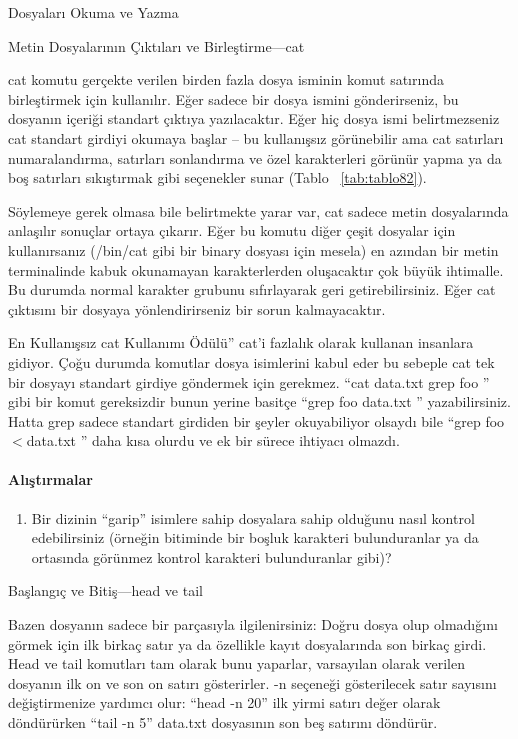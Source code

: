 \begin{section}{Dosyaları Okuma ve Yazma}
\begin{subsection}{Metin Dosyalarının Çıktıları ve Birleştirme—cat}

cat komutu gerçekte verilen birden fazla dosya isminin komut satırında birleştirmek için kullanılır. Eğer sadece bir dosya ismini gönderirseniz, bu dosyanın içeriği standart çıktıya yazılacaktır. Eğer hiç dosya ismi belirtmezseniz cat standart girdiyi okumaya başlar – bu kullanışsız görünebilir ama cat satırları numaralandırma, satırları sonlandırma ve özel karakterleri görünür yapma ya da boş satırları sıkıştırmak gibi seçenekler sunar (Tablo ~\ref{tab:tablo82}).

Söylemeye gerek olmasa bile belirtmekte yarar var, cat sadece metin dosyalarında anlaşılır sonuçlar ortaya çıkarır. Eğer bu komutu diğer çeşit dosyalar için kullanırsanız (/bin/cat gibi bir binary dosyası için mesela) en azından bir metin terminalinde kabuk okunamayan karakterlerden oluşacaktır çok büyük ihtimalle. Bu durumda normal karakter grubunu sıfırlayarak geri getirebilirsiniz. Eğer cat çıktısını bir dosyaya yönlendirirseniz bir sorun kalmayacaktır.

En Kullanışsız cat Kullanımı Ödülü” cat'i fazlalık olarak kullanan insanlara gidiyor. Çoğu durumda komutlar dosya isimlerini kabul eder bu sebeple cat tek bir dosyayı standart girdiye göndermek için gerekmez. “cat data.txt \textbar grep foo ” gibi bir komut gereksizdir bunun yerine basitçe “grep foo data.txt ” yazabilirsiniz. Hatta grep sadece standart girdiden bir şeyler okuyabiliyor olsaydı bile “grep foo $<$data.txt ” daha kısa olurdu ve ek bir sürece ihtiyacı olmazdı.

\paragraph{{\Huge{\PencilLeftDown}}Alıştırmalar}{
\begin{enumerate}
 \item Bir dizinin “garip” isimlere sahip dosyalara sahip olduğunu nasıl kontrol edebilirsiniz (örneğin bitiminde bir boşluk karakteri bulunduranlar ya da ortasında görünmez kontrol karakteri bulunduranlar gibi)?
\end{enumerate}}
\end{subsection}
\begin{subsection}{Başlangıç ve Bitiş—head ve tail}

Bazen dosyanın sadece bir parçasıyla ilgilenirsiniz: Doğru dosya olup olmadığını görmek için ilk birkaç satır ya da özellikle kayıt dosyalarında son birkaç girdi. Head ve tail komutları tam olarak bunu yaparlar, varsayılan olarak verilen dosyanın ilk on ve son on satırı gösterirler. -n seçeneği gösterilecek satır sayısını değiştirmenize yardımcı olur: “head -n 20” ilk yirmi satırı değer olarak döndürürken “tail -n 5” data.txt dosyasının son beş satırını döndürür.


\end{subsection}
\end{section}
